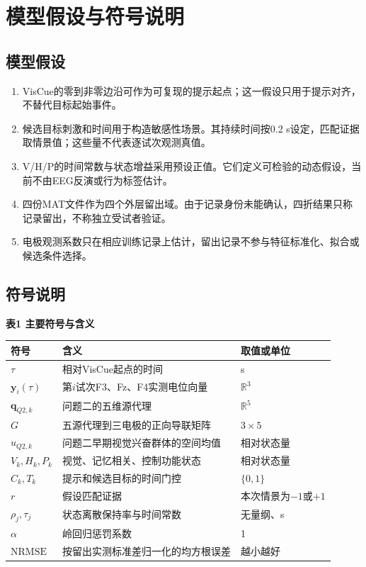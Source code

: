 \hypertarget{ux6a21ux578bux5047ux8bbeux4e0eux7b26ux53f7ux8bf4ux660e}{%
\section{模型假设与符号说明}\label{ux6a21ux578bux5047ux8bbeux4e0eux7b26ux53f7ux8bf4ux660e}}

\hypertarget{ux6a21ux578bux5047ux8bbe}{%
\subsection{模型假设}\label{ux6a21ux578bux5047ux8bbe}}

\begin{enumerate}
\def\labelenumi{\arabic{enumi}.}
\tightlist
\item
  VisCue的零到非零边沿可作为可复现的提示起点；这一假设只用于提示对齐，不替代目标起始事件。
\item
  候选目标刺激和时间用于构造敏感性场景。其持续时间按0.2 s设定，匹配证据取情景值；这些量不代表逐试次观测真值。
\item
  V/H/P的时间常数与状态增益采用预设正值。它们定义可检验的动态假设，当前不由EEG反演或行为标签估计。
\item
  四份MAT文件作为四个外层留出域。由于记录身份未能确认，四折结果只称记录留出，不称独立受试者验证。
\item
  电极观测系数只在相应训练记录上估计，留出记录不参与特征标准化、拟合或候选条件选择。
\end{enumerate}

\hypertarget{ux7b26ux53f7ux8bf4ux660e}{%
\subsection{符号说明}\label{ux7b26ux53f7ux8bf4ux660e}}

\textbf{表1 主要符号与含义}

\begin{longtable}[]{@{}lll@{}}
\toprule
符号 & 含义 & 取值或单位 \\
\midrule
\endhead
\(\tau\) & 相对VisCue起点的时间 & s \\
\(\mathbf y_i(\tau)\) & 第\(i\)试次F3、Fz、F4实测电位向量 & \(\mathbb R^3\) \\
\(\mathbf q_{Q2,k}\) & 问题二的五维源代理 & \(\mathbb R^5\) \\
\(G\) & 五源代理到三电极的正向导联矩阵 & \(3\times5\) \\
\(u_{Q2,k}\) & 问题二早期视觉兴奋群体的空间均值 & 相对状态量 \\
\(V_k,H_k,P_k\) & 视觉、记忆相关、控制功能状态 & 相对状态量 \\
\(C_k,T_k\) & 提示和候选目标的时间门控 & \(\{0,1\}\) \\
\(r\) & 假设匹配证据 & 本次情景为\(-1\)或\(+1\) \\
\(\rho_j,\tau_j\) & 状态离散保持率与时间常数 & 无量纲、s \\
\(\alpha\) & 岭回归惩罚系数 & 1 \\
\(\mathrm{NRMSE}\) & 按留出实测标准差归一化的均方根误差 & 越小越好 \\
\bottomrule
\end{longtable}

